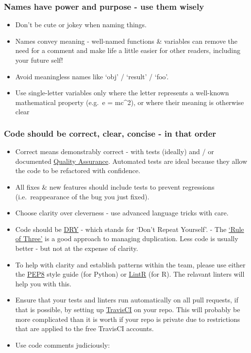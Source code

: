 \documentclass[]{book}
\providecommand{\tightlist}{%
  \setlength{\itemsep}{0pt}\setlength{\parskip}{0pt}}
\begin{document}
\hypertarget{names}{%
\subsubsection{Names have power and purpose - use them wisely}\label{names}}

\begin{itemize}
\tightlist
\item
  Don't be cute or jokey when naming things.
\item
  Names convey meaning - well-named functions \& variables can remove the need for a comment and make life a little easier for other readers, including your future self!
\item
  Avoid meaningless names like `obj' / `result' / `foo'.
\item
  Use single-letter variables only where the letter represents a well-known mathematical property (e.g.~e = mc\^{}2), or where their meaning is otherwise clear
\end{itemize}

\hypertarget{ccc}{%
\subsubsection{Code should be correct, clear, concise - in that order}\label{ccc}}

\begin{itemize}
\tightlist
\item
  Correct means demonstrably correct - with tests (ideally) and / or documented \href{quality_assurance.md}{Quality Assurance}. Automated tests are ideal because they allow the code to be refactored with confidence.
\item
  All fixes \& new features should include tests to prevent regressions (i.e.~reappearance of the bug you just fixed).
\item
  Choose clarity over cleverness - use advanced language tricks with care.
\item
  Code should be \href{https://en.wikipedia.org/wiki/Don\%27t_repeat_yourself}{DRY} - which stands for `Don't Repeat Yourself'. - The \href{https://en.wikipedia.org/wiki/Rule_of_three_(computer_programming)}{`Rule of Three'} is a good approach to managing duplication. Less code is usually better - but not at the expense of clarity.\\
\item
  To help with clarity and establish patterns within the team, please use either the \href{https://pypi.python.org/pypi/pep8}{PEP8} style guide (for Python) or \href{https://github.com/jimhester/lintr}{LintR} (for R). The relavant linters will help you with this.
\item
  Ensure that your tests and linters run automatically on all pull requests, if that is possible, by setting up \href{https://travis-ci.org/}{TravisCI} on your repo. This will probably be more complicated than it is worth if your repo is private due to restrictions that are applied to the free TravisCI accounts.
\item
  Use code comments judiciously:
\end{itemize}
\end{document}

